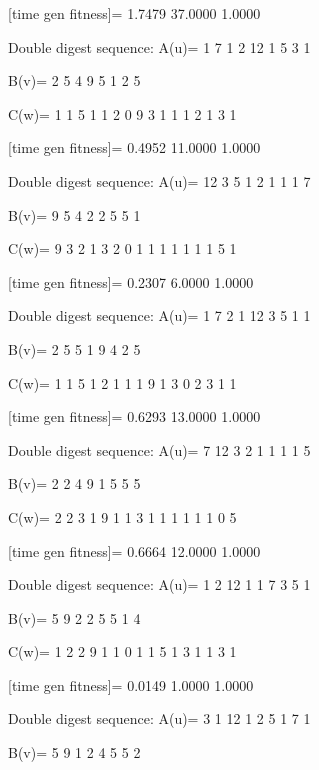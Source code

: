 [time gen fitness]=
    1.7479   37.0000    1.0000

Double digest sequence:
A(u)=
     1     7     1     2    12     1     5     3     1

B(v)=
     2     5     4     9     5     1     2     5

C(w)=
     1     1     5     1     1     2     0     9     3     1     1     1     2     1     3     1

[time gen fitness]=
    0.4952   11.0000    1.0000

Double digest sequence:
A(u)=
    12     3     5     1     2     1     1     1     7

B(v)=
     9     5     4     2     2     5     5     1

C(w)=
     9     3     2     1     3     2     0     1     1     1     1     1     1     1     5     1

[time gen fitness]=
    0.2307    6.0000    1.0000

Double digest sequence:
A(u)=
     1     7     2     1    12     3     5     1     1

B(v)=
     2     5     5     1     9     4     2     5

C(w)=
     1     1     5     1     2     1     1     1     9     1     3     0     2     3     1     1

[time gen fitness]=
    0.6293   13.0000    1.0000

Double digest sequence:
A(u)=
     7    12     3     2     1     1     1     1     5

B(v)=
     2     2     4     9     1     5     5     5

C(w)=
     2     2     3     1     9     1     1     3     1     1     1     1     1     1     0     5

[time gen fitness]=
    0.6664   12.0000    1.0000

Double digest sequence:
A(u)=
     1     2    12     1     1     7     3     5     1

B(v)=
     5     9     2     2     5     5     1     4

C(w)=
     1     2     2     9     1     1     0     1     1     5     1     3     1     1     3     1

[time gen fitness]=
    0.0149    1.0000    1.0000

Double digest sequence:
A(u)=
     3     1    12     1     2     5     1     7     1

B(v)=
     5     9     1     2     4     5     5     2

